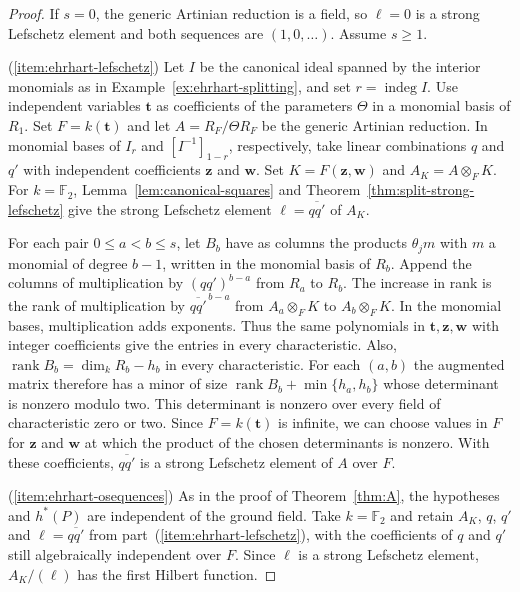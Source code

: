 \documentclass[a4paper,11pt]{amsart}
\DeclareMathOperator{\indeg}{indeg}
\newcommand{\kk}{k}
\theoremstyle{definition}
\begin{document}
\begin{proof}
If $s=0$, the generic Artinian reduction is a field, so $\ell=0$ is a strong Lefschetz element and both sequences are $(1,0,\ldots)$. Assume $s\ge1$.

\smallskip
\noindent\textup{(\ref{item:ehrhart-lefschetz})} Let $I$ be the canonical ideal spanned by the interior monomials as in Example~\ref{ex:ehrhart-splitting}, and set $r=\indeg I$. Use independent variables $\mathbf t$ as coefficients of the parameters $\Theta$ in a monomial basis of $R_1$. Set $F=\kk(\mathbf t)$ and let $A=R_F/\Theta R_F$ be the generic Artinian reduction. In monomial bases of $I_r$ and $[I^{-1}]_{1-r}$, respectively, take linear combinations $q$ and $q'$ with independent coefficients $\mathbf z$ and $\mathbf w$. Set $K=F(\mathbf z,\mathbf w)$ and $A_K=A\otimes_F K$. For $\kk=\mathbb F_2$, Lemma~\ref{lem:canonical-squares} and Theorem~\ref{thm:split-strong-lefschetz} give the strong Lefschetz element $\ell=\overline{qq'}$ of $A_K$.

For each pair $0\le a<b\le s$, let $B_b$ have as columns the products $\theta_j m$ with $m$ a monomial of degree $b-1$, written in the monomial basis of $R_b$. Append the columns of multiplication by $(qq')^{b-a}$ from $R_a$ to $R_b$. The increase in rank is the rank of multiplication by $\overline{qq'}^{\,b-a}$ from $A_a\otimes_F K$ to $A_b\otimes_F K$. In the monomial bases, multiplication adds exponents. Thus the same polynomials in $\mathbf t,\mathbf z,\mathbf w$ with integer coefficients give the entries in every characteristic. Also, $\operatorname{rank}B_b=\dim_{\kk}R_b-h_b$ in every characteristic. For each $(a,b)$ the augmented matrix therefore has a minor of size $\operatorname{rank}B_b+\min\{h_a,h_b\}$ whose determinant is nonzero modulo two. This determinant is nonzero over every field of characteristic zero or two. Since $F=\kk(\mathbf t)$ is infinite, we can choose values in $F$ for $\mathbf z$ and $\mathbf w$ at which the product of the chosen determinants is nonzero. With these coefficients, $\overline{qq'}$ is a strong Lefschetz element of $A$ over $F$.

\smallskip
\noindent\textup{(\ref{item:ehrhart-osequences})} As in the proof of Theorem~\ref{thm:A}, the hypotheses and $h^*(P)$ are independent of the ground field. Take $\kk=\mathbb F_2$ and retain $A_K$, $q$, $q'$ and $\ell=\overline{qq'}$ from part~\textup{(\ref{item:ehrhart-lefschetz})}, with the coefficients of $q$ and $q'$ still algebraically independent over $F$. Since $\ell$ is a strong Lefschetz element, $A_K/(\ell)$ has the first Hilbert function.


\end{proof}
\end{document}
